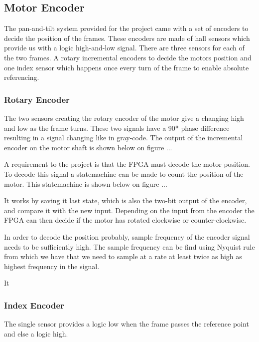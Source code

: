 \documentclass[12pt,a4paper]{report}
\begin{document}
\subsection{Motor Encoder}
The pan-and-tilt system provided for the project came with a set of encoders to decide the position of the frames. These encoders are made of hall sensors which provide us with a logic high-and-low signal. There are three sensors for each of the two frames. A rotary incremental encoders to decide the motors position and one index sensor which happens once every turn of the frame to enable absolute referencing.

\subsubsection{Rotary Encoder}
The two sensors creating the rotary encoder of the motor give a changing high and low as the frame turns. These two signals have a 90* phase difference resulting in a signal changing like in gray-code. The output of the incremental encoder on the motor shaft is shown below on figure ...


A requirement to the project is that the FPGA must decode the motor position. To decode this signal a statemachine can be made to count the position of the motor. This statemachine is shown below on figure ... 


It works by saving it last state, which is also the two-bit output of the encoder, and compare it with the new input. Depending on the input from the encoder the FPGA can then decide if the motor has rotated clockwise or counter-clockwise.

In order to decode the position probably, sample frequency of the encoder signal needs to be sufficiently high. The sample frequency can be find using Nyquist rule from which we have that we need to sample at a rate at least twice as high as highest frequency in the signal. 

It 


\subsubsection{Index Encoder}
The single sensor provides a logic low when the frame passes the reference point and else a logic high.
\end{document}
